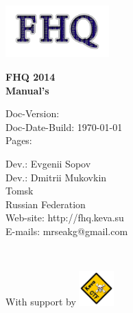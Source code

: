 \begin{titlepage}

\noindent
\begin{flushright}
\includegraphics[width=0.3\textwidth]{./img/logo}~
\\[3cm]

\end{flushright}
\begin{center}
{ \huge \bfseries  FHQ 2014 \\ Manual's \\[2cm] }
\end{center}

\noindent
\begin{minipage}{0.4\textwidth}
\begin{flushleft}
Doc-Version:  \\
Doc-Date-Build: \today \\
Pages: \pageref{LastPage} \\
\end{flushleft}
\end{minipage}%

\vfill


\noindent
\begin{minipage}{0.5\textwidth}
\begin{flushleft}
Dev.: Evgenii Sopov \\
Dev.: Dmitrii Mukovkin \\
Tomsk \\
Russian Federation \\[0.4cm]
Web-site: http://fhq.keva.su \\
E-mails: mrseakg@gmail.com
\end{flushleft}
\end{minipage}%
\\[1cm]

\noindent

\begin{minipage}{1.0\textwidth}
\begin{flushright}
With support by
\includegraphics[width=0.1\textwidth]{./img/keva}~
\end{flushright}
\end{minipage}%


\end{titlepage}
